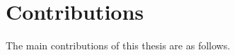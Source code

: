 %
%
\section{Contributions}\label{sec:intro-contributions}

The main contributions of this thesis are as follows.

